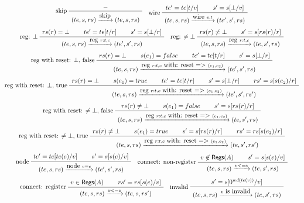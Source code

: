 \begin{table}[htbp]
  \begin{gather*}
    \infer[skip]
    {\seqq{(te, s, rs) \xrightarrow{\mbox{skip}} (te, s, rs)}}
    {\seqq{-}}
    \quad
    \inferii[wire]
    {\seqq{(te, s, rs) \xrightarrow{\mbox{wire } v: t} (te', s', rs)}}
   {\seqq{te' = te [t/v]}} {\seqq{s' = s [\bot/v]}}
    \\[1ex]
    \inferiii[reg: $\bot$]
    {\seqq{(te, s, rs) \xrightarrow{\mbox{reg } r: t, c} (te', s', rs)}}
   {\seqq{rs(r) = \bot}} {\seqq{te' = te [t/r]}} {\seqq{s' = s[\bot/r]}}
    \quad
    \inferii[reg: $\neq\bot$]
    {\seqq{(te, s, rs) \xrightarrow{\mbox{reg } r: t, c} (te, s', rs)}}
   {\seqq{rs(r) \neq \bot}} {\seqq{s' = s[rs(r)/r]}}
    \\[1ex]
    \inferiv[reg with reset: $\bot$, false]
    {\seqq{(te, s, rs) \xrightarrow{\mbox{reg } r: t, c \mbox{ with: reset => }(e_1, e_2)} (te', s', rs)}}
   {\seqq{rs(r) = \bot}} {\seqq{ s(e_1)= false}}  {\seqq{te' = te [t/r]}} {\seqq{s' = s[\bot/r]}}
    \\[1ex]
    \inferv[reg with reset: $\bot$, true]
    {\seqq{(te, s, rs) \xrightarrow{\mbox{reg } r: t, c \mbox{ with: reset => }(e_1, e_2)} (te', s', rs')}}
   {\seqq{rs(r) = \bot}} {\seqq{ s(e_1)= true}}  {\seqq{te' = te [t/r]}} {\seqq{s' = s[\bot/r]}} {\seqq{rs' = s[s(e_2)/r]}}
    \\[1ex]
    \inferiii[reg with reset: $\neq\bot$, false]
    {\seqq{(te, s, rs) \xrightarrow{\mbox{reg } r: t, c \mbox{ with: reset => }(e_1, e_2)} (te, s', rs)}}
   {\seqq{rs(r) \neq \bot}} {\seqq{ s(e_1)= false}} {\seqq{s' = s[rs(r)/r]}}
    \\[1ex]
    \inferiv[reg with reset: $\neq\bot$, true]
    {\seqq{(te, s, rs) \xrightarrow{\mbox{reg } r: t, c \mbox{ with: reset => }(e_1, e_2)} (te, s', rs')}}
   {\seqq{rs(r) \neq \bot}} {\seqq{ s(e_1)= true}} {\seqq{s' = s[rs(r)/r]}} {\seqq{rs' = rs[s(e_2)/r]}}
    \\[1ex]
    \inferii[node]
    {\seqq{(te, s, rs) \xrightarrow{\mbox{node } v = e} (te', s', rs)}}
   {\seqq{te' = te[te(e)/v]}} {\seqq{s' = s[s(e)/v]}}
    \quad
    \inferii[connect: non-register]
    {\seqq{(te, s, rs) \xrightarrow{v <= e} (te, s', rs)}}
   {\seqq{v \not \in \registers(A)}} {\seqq{s' = s[s(e)/v]}}
    \\[1ex]
    \inferii[connect: register]
    {\seqq{(te, s, rs) \xrightarrow{v <= e} (te, s, rs')}}
   {\seqq{v \in \registers(A)}} {\seqq{rs' = rs[s(e)/v]}}
  \quad
    \infer[invalid]
    {\seqq{(te, s, rs) \xrightarrow{v \mbox{ is invalid}} (te, s', rs)}}
   {\seqq{s' = s[0^{wd(te(v))}/v]}}
  \end{gather*}
  \caption{Operational semantics of LoFIRRTL statements.}
  \label{tab:lofirrtl-sem}
  \vspace{-6mm}
\end{table}


